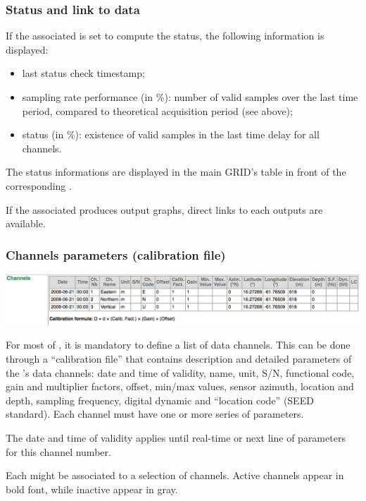 \subsubsection{Status and link to data}

If the associated  is set to compute the  status, the following information is displayed:
\begin{itemize}
\item last status check timestamp;
\item sampling rate performance (in \%): number of valid samples over the last time period, compared to theoretical acquisition period (see above);
\item status (in \%): existence of valid samples in the last time delay for all channels.
\end{itemize}

The status informations are displayed in the main GRID's table in front of the corresponding .

If the associated  produces output graphs, direct links to each outputs are available.


\subsubsection{Channels parameters (calibration file)}
\label{clb}

\includegraphics[width=\textwidth]{figures/CLB_table.png}

For most of , it is mandatory to define a list of data channels. This can be done through a ``calibration file'' that contains description and detailed parameters of the 's data channels: date and time of validity, name, unit, S/N, functional code, gain and multiplier factors, offset, min/max values, sensor azimuth, location and depth, sampling frequency, digital dynamic and ``location code'' (SEED standard). Each channel must have one or more series of parameters. 

The date and time of validity applies until real-time or next line of parameters for this channel number.

Each  might be associated to a selection of channels. Active channels appear in bold font, while inactive appear in gray.

